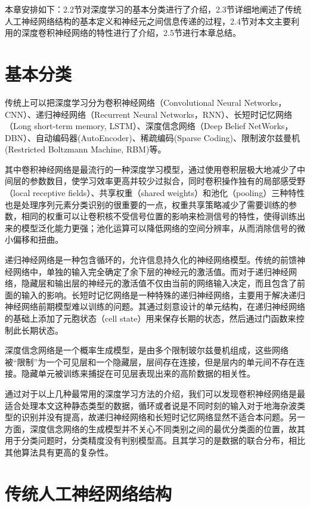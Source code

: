 本章安排如下：2.2节对深度学习的基本分类进行了介绍，2.3节详细地阐述了传统人工神经网络结构的基本定义和神经元之间信息传递的过程，2.4节对本文主要利用的深度卷积神经网络的特性进行了介绍，2.5节进行本章总结。


\section{基本分类}
传统上可以把深度学习分为卷积神经网络（Convolutional Neural Networks， CNN）、递归神经网络（Recurrent Neural Networks，RNN）、长短时记忆网络（Long short-term memory, LSTM）、深度信念网络（Deep Belief NetWorks，DBN）、自动编码器(AutoEncoder)、稀疏编码(Sparse Coding)、限制波尔兹曼机(Restricted Boltzmann Machine, RBM)等。

其中卷积神经网络是最流行的一种深度学习模型，通过使用卷积层极大地减少了中间层的参数数目，使学习效率更高并较少过拟合，同时卷积操作独有的局部感受野（local receptive fields）、共享权重（shared weights）和池化（pooling）三种特性也是处理序列元素分类识别的很重要的一点，权重共享策略减少了需要训练的参数，相同的权重可以让卷积核不受信号位置的影响来检测信号的特性，使得训练出来的模型泛化能力更强；池化运算可以降低网络的空间分辨率，从而消除信号的微小偏移和扭曲。

递归神经网络是一种包含循环的，允许信息持久化的神经网络模型。传统的前馈神经网络中，单独的输入完全确定了余下层的神经元的激活值。而对于递归神经网络，隐藏层和输出层的神经元的激活值不仅由当前的网络输入决定，而且包含了前面的输入的影响。长短时记忆网络是一种特殊的递归神经网络，主要用于解决递归神经网络前期模型难以训练的问题。其通过刻意设计的单元结构，在递归神经网络的基础上添加了元胞状态（cell state）用来保存长期的状态，然后通过门函数来控制此长期状态。

深度信念网络是一个概率生成模型，是由多个限制玻尔兹曼机组成，这些网络被“限制”为一个可见层和一个隐藏层，层间存在连接，但是层内的单元间不存在连接。隐藏单元被训练来捕捉在可见层表现出来的高阶数据的相关性。

通过对于以上几种最常用的深度学习方法的介绍，我们可以发现卷积神经网络是最适合处理本文这种静态类型的数据，循环或者说是不同时刻的输入对于地海杂波类型的识别并没有提高，故递归神经网络和长短时记忆网络显然不适合本问题。另一方面，深度信念网络的生成模型并不关心不同类别之间的最优分类面的位置，故其用于分类问题时，分类精度没有判别模型高。且其学习的是数据的联合分布，相比其他算法具有更高的复杂性。

\section{传统人工神经网络结构}

